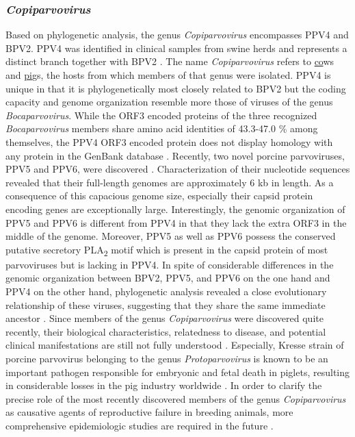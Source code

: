 

\subsubsection{\textit{Copiparvovirus}}
Based on phylogenetic analysis, the genus \textit{Copiparvovirus} encompasses PPV4 and BPV2. PPV4 was identified in clinical samples from swine herds \cite{pmid20339886, pmid21092136, pmid22967311} and represents a distinct branch together with BPV2 \cite{pmid11562506}. The name \textit{Copiparvovirus} refers to \underline{co}ws and \underline{pi}gs, the hosts from which members of that genus were isolated. PPV4 is unique in that it is phylogenetically most closely related to BPV2 but the coding capacity and genome organization resemble more those of viruses of the genus \textit{Bocaparvovirus}. While the ORF3 encoded proteins of the three recognized \textit{Bocaparvovirus} members share amino acid identities of 43.3-47.0 \% among themselves, the PPV4 ORF3 encoded protein does not display homology with any protein in the GenBank database \cite{pmid20339886, pmid21092136}. 
Recently, two novel porcine parvoviruses, PPV5 and PPV6, were discovered \cite{pmid23405295, pmid25442288}. Characterization of their nucleotide sequences revealed that their full-length genomes are approximately 6 kb in length. As a consequence of this capacious genome size, especially their capsid protein encoding genes are exceptionally large. Interestingly, the genomic organization of PPV5 and PPV6 is different from PPV4 in that they lack the extra ORF3 in the middle of the genome. Moreover, PPV5 as well as PPV6 possess the conserved putative secretory PLA\textsubscript{2} motif which is present in the capsid protein of most parvoviruses but is lacking in PPV4. In spite of considerable differences in the genomic organization between BPV2, PPV5, and PPV6 on the one hand and PPV4 on the other hand, phylogenetic analysis revealed a close evolutionary relationship of these viruses, suggesting that they share the same immediate ancestor \cite{pmid23762339, pmid25442288}.      
Since members of the genus \textit{Copiparvovirus} were discovered quite recently, their biological characteristics, relatedness to disease, and potential clinical manifestations are still not fully understood \cite{pmid20339886, pmid21092136, pmid23762339, pmid25442288}. Especially, Kresse strain of porcine parvovirus belonging to the genus \textit{Protoparvovirus} is known to be an important pathogen responsible for embryonic and fetal death in piglets, resulting in considerable losses in the pig industry worldwide \cite{pmid6314634, pmid427636, pmid999067, pmid3006323}. In order to clarify the precise role of the most recently discovered members of the genus \textit{Copiparvovirus} as causative agents of reproductive failure in breeding animals, more comprehensive epidemiologic studies are required in the future \cite{pmid25442288}. 



